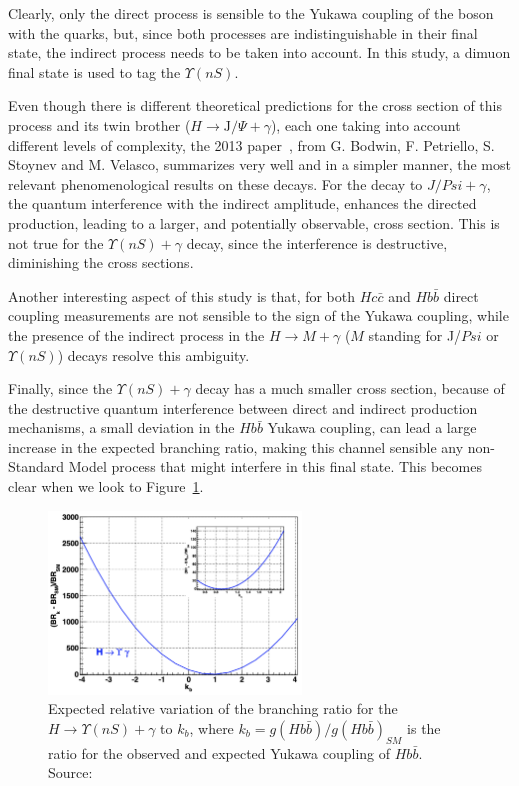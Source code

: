 Clearly, only the direct process is sensible to the Yukawa coupling of the boson with the quarks, but, since both processes are indistinguishable in their final state, the indirect process needs to be taken into account. In this study, a dimuon final state is used to tag the $\Upsilon(nS)$.

Even though there is different theoretical predictions for the cross section of this process and its twin brother ($H \rightarrow \text{J/}\Psi + \gamma$), each one taking into account different levels of complexity, the 2013 paper~\cite{PhysRevD.88.053003}, from G. Bodwin, F. Petriello, S. Stoynev and M. Velasco, summarizes very well and in a simpler manner, the most relevant phenomenological results on these decays. For the decay to $J/Psi + \gamma$, the quantum interference with the indirect amplitude, enhances the directed production, leading to a larger, and potentially observable, cross section. This is not true for the $\Upsilon(nS) + \gamma$ decay, since the interference is destructive, diminishing the cross sections. 

Another interesting aspect of this study is that, for both $Hc\bar{c}$ and $Hb\bar{b}$ direct coupling measurements are not sensible to the sign of the Yukawa coupling, while the presence of the indirect process in the $H \rightarrow M + \gamma$ ($M$ standing for J/$Psi$ or $\Upsilon(nS)$) decays resolve this ambiguity.

Finally, since the $\Upsilon(nS) + \gamma$ decay has a much smaller cross section, because of the destructive quantum interference between direct and indirect production mechanisms, a small deviation in the $Hb\bar{b}$ Yukawa coupling, can lead a large increase in the expected branching ratio, making this channel sensible any non-Standard Model process that might interfere in this final state. This becomes clear when we look to Figure~\ref{hbb_coup}.

\begin{figure}[!htbp]
  \begin{center}
    \includegraphics[width=0.6\textwidth ]{figures_and_tables/theory/hbb_coup.png}
  \end{center}\vspace*{-.5cm}
  \caption{Expected relative variation of the branching ratio for the $H \rightarrow \Upsilon(nS) + \gamma$ to $k_b$, where $k_b = g(Hb\bar{b})/g(Hb\bar{b})_{SM}$ is the ratio for the observed and expected Yukawa coupling of $Hb\bar{b}$. Source:~\cite{PhysRevD.88.053003}}
  \label{hbb_coup}
\end{figure}


